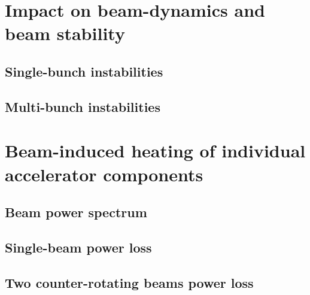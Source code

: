 \section{Impact on beam-dynamics and beam stability}

\subsection{Single-bunch instabilities}

\subsection{Multi-bunch instabilities}

\section{Beam-induced heating of individual accelerator components}

\subsection{Beam power spectrum}

\subsection{Single-beam power loss}

\subsection{Two counter-rotating beams power loss}







